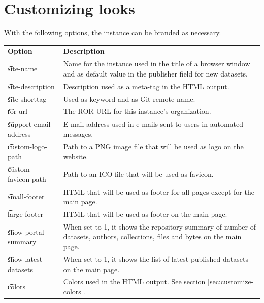 \section{Customizing looks}

  With the following options, the instance can be branded as necessary.

\begin{tabularx}{\textwidth}{*{1}{!{\VRule[-1pt]}l}!{\VRule[-1pt]}X}
  \headrow
  \textbf{Option}             & \textbf{Description}\\
  \t{site-name}               & Name for the instance used in the title of a
                                browser window and as default value in the
                                publisher field for new datasets.\\
  \t{site-description}        & Description used as a meta-tag in the HTML
                                output.\\
  \t{site-shorttag}           & Used as keyword and as Git remote name.\\
  \t{ror-url}                 & The ROR URL for this instance's organization.\\
  \t{support-email-address}   & E-mail address used in e-mails sent to users
                                in automated messages.\\
  \t{custom-logo-path}        & Path to a PNG image file that will be used as
                                logo on the website.\\
  \t{custom-favicon-path}     & Path to an ICO file that will be used as
                                favicon.\\
  \t{small-footer}            & HTML that will be used as footer for all
                                pages except for the main page.\\
  \t{large-footer}            & HTML that will be used as footer on the
                                main page.\\
  \t{show-portal-summary}     & When set to 1, it shows the repository summary
                                of number of datasets, authors, collections,
                                files and bytes on the main page.\\
  \t{show-latest-datasets}    & When set to 1, it shows the list of latest
                                published datasets on the main page.\\
  \t{colors}                  & Colors used in the HTML output. See section
                                \ref{sec:customize-colors}.
\end{tabularx}

